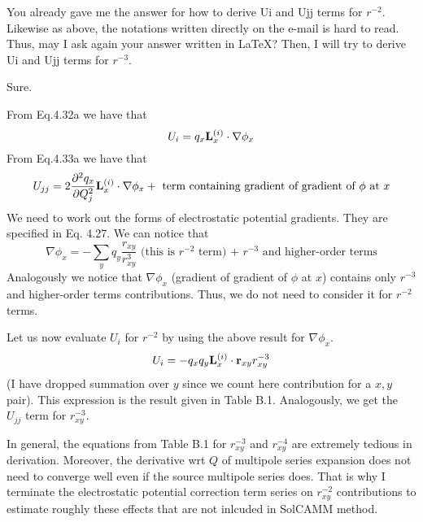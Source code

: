 \documentclass{exam}
\newcommand{\sderiv}[2]{\ensuremath{
\frac{\partial^2 #1}{\partial #2^2}
}}
\begin{document}
\begin{questions}
\question You already gave me the answer for how to derive Ui and Ujj terms for $r^{-2}$.
Likewise as above, the notations written directly on the e-mail is hard to read.
Thus, may I ask again your answer written in LaTeX?
Then, I will try to derive Ui and Ujj terms for $r^{-3}$.

\begin{solution}
Sure.

From Eq.4.32a we have that
%
\begin{equation}
U_i = q_x   {\bf L}_x^{(i)} \cdot \nabla \phi_x 
\end{equation}
%
From Eq.4.33a we have that
%
\begin{equation}
U_{jj} = 2\sderiv{q_x}{Q_j}  {\bf L}_x^{(i)} \cdot \nabla \phi_x  + \text{ term containing gradient of gradient of $\phi$ at $x$}
\end{equation}
%
We need to work out the forms of electrostatic potential gradients. 
They are specified in Eq. 4.27. We can notice that
%
\begin{equation}
\nabla \phi_x = - \sum_y    q_y  \frac{r_{xy}}{ r_{xy}^3} \text{ (this is $r^{-2}$ term) + $r^{-3}$ and higher-order terms}
\end{equation}
%
Analogously we notice that $\nabla \phi_x$ (gradient of gradient of $\phi$ at $x$) contains only $r^{-3}$ 
and higher-order terms contributions. Thus, we do not need to consider it for $r^{-2}$ terms.

Let us now evaluate $U_i$ for $r^{-2}$ by using the above result for $\nabla \phi_x$.
%
\begin{equation}
U_i = -q_x q_y {\bf L}_x^{(i)} \cdot  {\bf r}_{xy}   r_{xy}^{-3}  
\end{equation}
%
(I have dropped summation over $y$ since we count here contribution for a $x,y$ pair).
This expression is the result given in Table B.1. Analogously, we get the $U_{jj}$ term for $r_{xy}^{-3}$.

In general, the equations from Table B.1 for $r_{xy}^{-3}$ and $r_{xy}^{-4}$ are extremely tedious in derivation. 
Moreover, the derivative wrt $Q$ of multipole series expansion does not need to converge well 
even if the source multipole series does. That is why I terminate the electrostatic 
potential correction term series on $r_{xy}^{-2}$ contributions to estimate roughly these effects 
that are not inlcuded in SolCAMM method.
\end{solution}

\end{questions}
\end{document}
